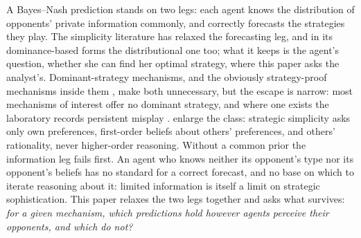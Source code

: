 \documentclass[12pt]{article}
\theoremstyle{definition}
\begin{document}
A Bayes--Nash prediction stands on two legs: each agent knows the distribution of opponents' private information commonly, and correctly forecasts the strategies they play. The simplicity literature has relaxed the forecasting leg, and in its dominance-based forms the distributional one too; what it keeps is the agent's question, whether she can find her optimal strategy, where this paper asks the analyst's. Dominant-strategy mechanisms, and the obviously strategy-proof mechanisms inside them \citep{li2017osp}, make both unnecessary, but the escape is narrow: most mechanisms of interest offer no dominant strategy, and where one exists the laboratory records persistent misplay \citep{kagel1987, kagel1993independent}. \citet{borgersli2019strategically} enlarge the class: strategic simplicity asks only own preferences, first-order beliefs about others' preferences, and others' rationality, never higher-order reasoning. Without a common prior the information leg fails first. An agent who knows neither its opponent's type nor its opponent's beliefs has no standard for a correct forecast, and no base on which to iterate reasoning about it: limited information is itself a limit on strategic sophistication. This paper relaxes the two legs together and asks what survives: \emph{for a given mechanism, which predictions hold however agents perceive their opponents, and which do not?}
\end{document}

